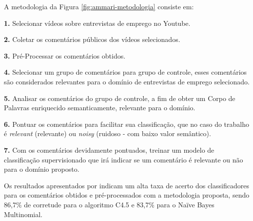 A metodologia da Figura \ref{fig:ammari-metodologia} consiste em:

\textbf{1.} Selecionar vídeos sobre entrevistas de emprego no Youtube.

\textbf{2.} Coletar os comentários públicos dos vídeos selecionados.

\textbf{3.} Pré-Processar os comentários obtidos.

\textbf{4.} Selecionar um grupo de comentários para grupo de controle, esses comentários são considerados relevantes para o domínio de entrevistas de emprego selecionado.

\textbf{5.} Analisar os comentários do grupo de controle, a fim de obter um Corpo de Palavras enriquecido semanticamente, relevante para o domínio.

\textbf{6.} Pontuar os comentários para facilitar sua classificação, que no caso do trabalho \cite{ammari2011filteringYt} é \textit{relevant} (relevante) ou \textit{noisy} (ruidoso - com baixo valor semântico).

\textbf{7.} Com os comentários devidamente pontuados, treinar um modelo de classificação supervisionado que irá indicar se um comentário é relevante ou não para o domínio proposto.

Os resultados apresentados por \cite{ammari2011filteringYt} indicam um alta taxa de acerto dos classificadores para os comentários obtidos e pré-processados com a metodologia proposta, sendo 86,7\% de corretude para o algoritmo C4.5 e 83,7\% para o Naïve Bayes Multinomial.

